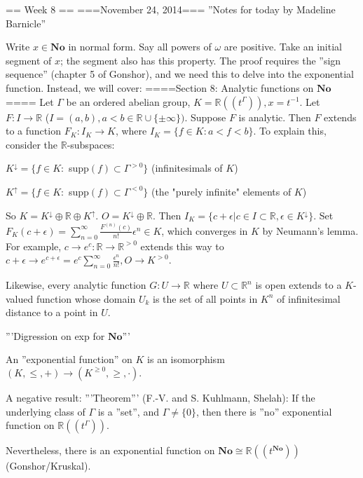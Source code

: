 == Week 8 ==
===November 24, 2014===
''Notes for today by Madeline Barnicle''

Write $x \in \mathbf{No}$ in normal form. Say all powers of $\omega$ are positive. Take an initial segment of $x$; the segment also has this property. The proof requires the ''sign sequence'' (chapter 5 of Gonshor), and we need this to delve into the exponential function. Instead, we will cover:
====Section 8: Analytic functions on $\mathbf{No}$====
Let $\Gamma$ be an ordered abelian group, $K = \mathbb{R}((t^{\Gamma})), x=t^{-1}$. Let $F: I \rightarrow \mathbb{R}$ ($I=(a, b), a<b \in \mathbb{R} \cup \{\pm \infty \})$. Suppose $F$ is analytic. Then $F$ extends to a function $F_K : I_K \rightarrow K$, where $I_K = \{f \in K: a<f<b\}$. To explain this, consider the $\mathbb{R}$-subspaces:

$K^{\downarrow}=\{f \in K:$ supp$(f) \subset \Gamma^{> 0} \}$ (infinitesimals of $K$)

$K^{\uparrow}=\{f \in K:$ supp$(f) \subset \Gamma^{< 0} \}$ (the "purely infinite" elements of $K$)

So $K=K^{\downarrow} \oplus \mathbb{R} \oplus K^{\uparrow}$. $O=K^{\downarrow} \oplus \mathbb{R}$. Then $I_K=\{c+\epsilon | c \in I \subset \mathbb{R}, \epsilon \in K^{\downarrow}\}$. Set $F_K (c+\epsilon)=\sum_{n=0}^{\infty} \frac{F^{(n)}(c)}{n!}\epsilon^{n} \in K$, which converges in $K$ by Neumann's lemma. For example, $c \rightarrow e^c: \mathbb{R} \rightarrow \mathbb{R}^{> 0}$ extends this way to $c+\epsilon \rightarrow e^{c+\epsilon}=e^c \sum_{n=0}^{\infty} \frac{\epsilon^n}{n!}, O \rightarrow K^{> 0}$.

Likewise, every analytic function $G: U \rightarrow \mathbb{R}$ where $U \subset \mathbb{R}^n$ is open extends to a $K$-valued function whose domain $U_k$ is the set of all points in $K^n$ of infinitesimal distance to a point in $U$.

'''Digression on exp for $\mathbf{No}$'''

An ''exponential function'' on $K$ is an isomorphism $(K, \leq, +) \rightarrow (K^{\geq 0}, \geq, \cdot).$

A negative result:
'''Theorem''' (F.-V. and S. Kuhlmann, Shelah): If the underlying class of $\Gamma$ is a ''set'', and $\Gamma \neq \{0\}$, then there is ''no'' exponential function on $\mathbb{R}((t^{\Gamma}))$.

Nevertheless, there is an exponential function on $\mathbf{No} \cong \mathbb{R}((t^{\mathbf{No}}))$ (Gonshor/Kruskal).

